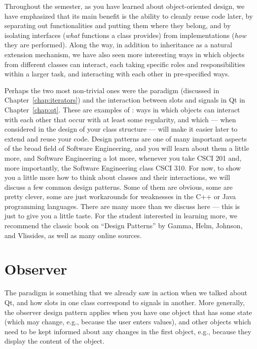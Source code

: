 Throughout the semester, as you have learned about object-oriented
design, we have emphasized that its main benefit is the ability to
cleanly reuse code later, by separating out functionalities and
putting them where they belong, and by isolating interfaces
(\emph{what} functions a class provides) from implementations
(\emph{how} they are performed). Along the way, in addition to
inheritance as a natural extension mechanism, we have also seen more
interesting ways in which objects from different classes can interact,
each taking specific roles and responsibilities within a larger task,
and interacting with each other in pre-specified ways.

Perhaps the two most non-trivial ones were the 
paradigm (discussed in Chapter~\ref{chap:iterators}) and the
interaction between slots and signals in Qt in Chapter~\ref{chap:qt}.
These are examples of : ways in which objects
can interact with each other that occur with at least some regularity,
and which --- when considered in the design of your class structure
--- will make it easier later to extend and reuse your code.
Design patterns are one of many important aspects of the broad field
of Software Engineering, and you will learn about them a little more,
and Software Engineering a lot more, whenever you take CSCI 201 and,
more importantly, the Software Engineering class CSCI 310.
For now, to show you a little more how to think about classes and
their interactions, we will discuss a few common design patterns.
Some of them are obvious, some are pretty clever, some are just
workarounds for weaknesses in the C++ or Java programming
languages. There are many more than we discuss here --- this is just
to give you a little taste.
For the student interested in learning more, we recommend the classic
book on ``Design Patterns'' by Gamma, Helm, Johnson, and Vlissides, as
well as many online sources.

\section{Observer}
The  paradigm is something that we already saw in
action when we talked about Qt, and how slots in one class correspond
to signals in another. More generally, the observer design pattern
applies when you have one object that has some state (which may
change, e.g., because the user enters values), and other objects which
need to be kept informed about any changes in the first object, e.g.,
because they display the content of the object.

